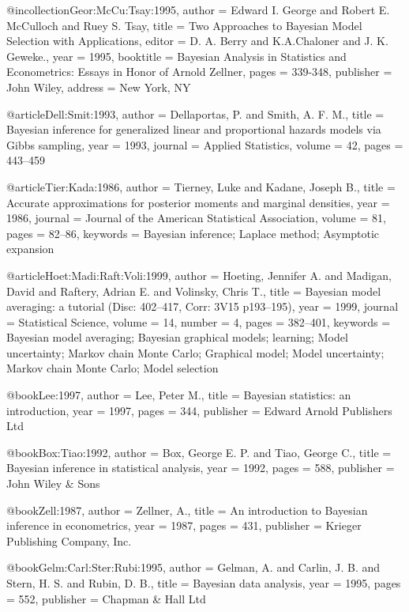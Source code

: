 @incollection{Geor:McCu:Tsay:1995,
    author = {Edward I. George and Robert E. McCulloch and Ruey S.  Tsay},
    title = {Two Approaches to Bayesian Model Selection with Applications},
    editor = {D. A. Berry and K.A.Chaloner and J. K. Geweke.},
    year = {1995},
    booktitle = {Bayesian Analysis in Statistics and Econometrics: Essays in Honor of Arnold Zellner},
    pages = {339-348},
    publisher = {John Wiley},
    address = {New York, NY}
}

@article{Dell:Smit:1993,
    author = {Dellaportas, P. and Smith, A. F. M.},
    title = {{B}ayesian inference for generalized linear and proportional hazards models via {G}ibbs sampling},
    year = {1993},
    journal = {Applied Statistics},
    volume = {42},
    pages = {443--459}
}


@article{Tier:Kada:1986,
    author = {Tierney, Luke and Kadane, Joseph B.},
    title = {Accurate approximations for posterior moments and marginal densities},
    year = {1986},
    journal = {Journal of the American Statistical Association},
    volume = {81},
    pages = {82--86},
    keywords = {Bayesian inference; Laplace method; Asymptotic expansion}
}

@article{Hoet:Madi:Raft:Voli:1999,
    author = {Hoeting, Jennifer A. and Madigan, David and Raftery,
Adrian E. and Volinsky, Chris T.},
    title = {Bayesian model averaging: a tutorial ({D}isc: 402--417, {C}orr: 3{V}15 p193--195)},
    year = {1999},
    journal = {Statistical Science},
    volume = {14},
    number = {4},
    pages = {382--401},
    keywords = {Bayesian model averaging; Bayesian graphical models;
learning; Model uncertainty; Markov chain Monte Carlo; Graphical
model; Model uncertainty; Markov chain Monte Carlo; Model selection}
}

@book{Lee:1997,
    author = {Lee, Peter M.},
    title = {Bayesian statistics: an introduction},
    year = {1997},
    pages = {344},
    publisher = {Edward Arnold Publishers Ltd}
}

@book{Box:Tiao:1992,
    author = {Box, George E. P. and Tiao, George C.},
    title = {Bayesian inference in statistical analysis},
    year = {1992},
    pages = {588},
    publisher = {John Wiley & Sons}
}

@book{Zell:1987,
    author = {Zellner, A.},
    title = {An introduction to {B}ayesian inference in econometrics},
   year = {1987},
    pages = {431},
    publisher = {Krieger Publishing Company, Inc.}
}

@book{Gelm:Carl:Ster:Rubi:1995,
    author = {Gelman, A. and Carlin, J. B. and Stern, H. S. and Rubin, D. B.},
    title = {Bayesian data analysis},
    year = {1995},
    pages = {552},
    publisher = {Chapman \& Hall Ltd}
}

